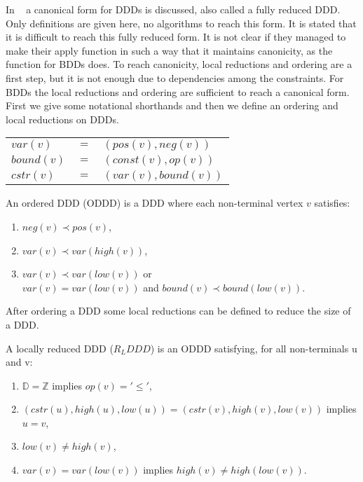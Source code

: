 In ~\cite{ddds} a canonical form for DDDs is discussed, also called a fully reduced DDD. Only definitions are given here, no algorithms to reach this form. It is stated that it is difficult to reach this fully reduced form. It is not clear if they managed to make their apply function in such a way that it maintains canonicity, as the function for BDDs does. To reach canonicity, local reductions and ordering are a first step, but it is not enough due to dependencies among the constraints. For BDDs the local reductions and ordering are sufficient to reach a canonical form. First we give some notational shorthands and then we define an ordering and local reductions on DDDs.
%
\begin{center}
\begin{tabular}{lll}
$var(v)$   & $=$ & $(pos(v),neg(v))$   \\
$bound(v)$ & $=$ & $(const(v),op(v))$  \\
$cstr(v)$  & $=$ & $(var(v),bound(v))$
\end{tabular}
\end{center}

\begin{mydef}
\label{def:ODDD}
An ordered DDD (ODDD) is a DDD where each non-terminal vertex $v$ satisfies:
\begin{enumerate}
  \item $neg(v) \prec pos(v)$,
  \item $var(v) \prec var(high(v))$,
  \item $var(v) \prec var(low(v))$ or \\ $var(v) = var(low(v))$ and $bound(v) \prec bound(low(v))$.
\end{enumerate}
\end{mydef}

After ordering a DDD some local reductions can be defined to reduce the size of a DDD.

\begin{mydef}
A locally reduced DDD ($R_LDDD$) is an ODDD satisfying, for all non-terminals u and v:
\begin{enumerate}
  \item $\mathbb{D} = \mathbb{Z}$ implies $op(v) = '\leq'$,
  \item $(cstr(u),high(u),low(u)) = (cstr(v),high(v),low(v))$ implies $u = v$,
  \item $low(v) \neq high(v)$,
  \item $var(v) = var(low(v))$ implies $high(v) \neq high(low(v))$.
\end{enumerate}
\end{mydef}

